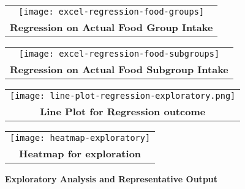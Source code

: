 \begin{figure}
\begin{tabular}{|c|}
\hline
\texttt{[image: excel-regression-food-groups]} \\
\textbf{Regression on Actual Food Group Intake}\\
\hline
\end{tabular}

\begin{tabular}{|c|}
\hline
\texttt{[image: excel-regression-food-subgroups]}\\
\textbf{Regression on Actual Food Subgroup Intake} \\
\hline
\end{tabular}

\begin{tabular}{|c|}
\hline
\texttt{[image: line-plot-regression-exploratory.png]}\\
\textbf{Line Plot for Regression outcome}\\
\hline
\end{tabular}

\begin{tabular}{|c|}
\hline
\texttt{[image: heatmap-exploratory]}\\
\textbf{Heatmap for exploration}\\
\hline
\end{tabular}
\caption{\textbf{Exploratory Analysis and Representative Output}}
\label{exploratory-output}
\end{figure}